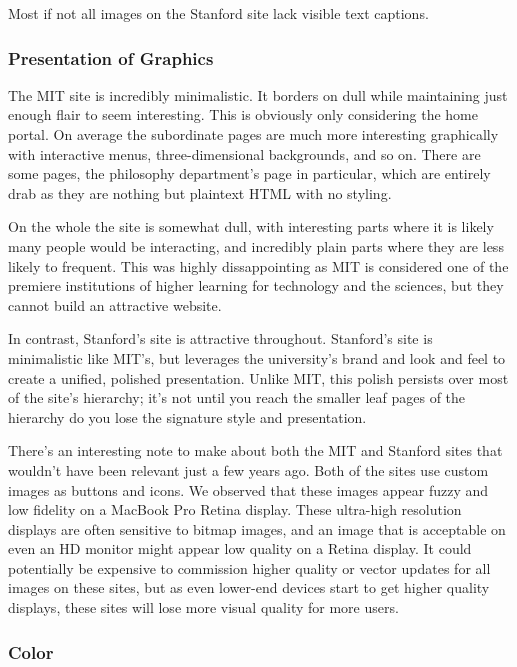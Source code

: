Most if not all images on the Stanford site lack visible text captions.

\subsubsection*{Presentation of Graphics}

The MIT site is incredibly minimalistic. It borders on dull while maintaining just enough flair
to seem interesting. This is obviously only considering the home portal. On average the
subordinate pages are much more interesting graphically with interactive menus,
three-dimensional backgrounds, and so on. There are some pages, the philosophy department's
page in particular, which are entirely drab as they are nothing but plaintext HTML with no
styling.

On the whole the site is somewhat dull, with interesting parts where it is likely many
people would be interacting, and incredibly plain parts where they are less likely to
frequent. This was highly dissappointing as MIT is considered one of the premiere
institutions of higher learning for technology and the sciences, but they cannot build an
attractive website.

In contrast, Stanford's site is attractive throughout. Stanford's site is minimalistic
like MIT's, but leverages the university's brand and look and feel to create a unified,
polished presentation. Unlike MIT, this polish persists over most of the site's
hierarchy; it's not until you reach the smaller leaf pages of the hierarchy do you
lose the signature style and presentation.

There's an interesting note to make about both the MIT and Stanford sites that wouldn't
have been relevant just a few years ago. Both of the sites use custom images as buttons
and icons. We observed that these images appear fuzzy and low fidelity on a MacBook
Pro Retina display. These ultra-high resolution displays are often sensitive to
bitmap images, and an image that is acceptable on even an HD monitor might appear
low quality on a Retina display. It could potentially be expensive to commission
higher quality or vector updates for all images on these sites, but as even lower-end
devices start to get higher quality displays, these sites will lose more visual
quality for more users.

\subsubsection*{Color}

